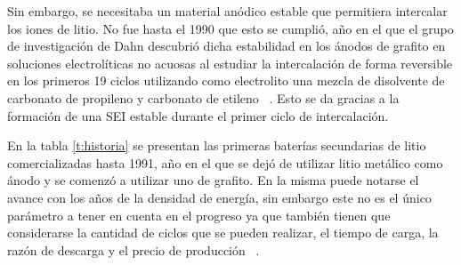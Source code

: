 Sin embargo, se necesitaba un material anódico estable que permitiera intercalar
los iones de litio. No fue hasta el 1990 que esto se cumplió, año en el que el
grupo de investigación de Dahn descubrió dicha estabilidad en los ánodos de 
grafito en soluciones electrolíticas no acuosas al estudiar la intercalación de 
forma reversible en los primeros 19 ciclos utilizando como electrolito una mezcla 
de disolvente de carbonato de propileno y carbonato de etileno ~\cite{fong1990}. 
Esto se da gracias a la formación de una SEI estable durante el primer ciclo de 
intercalación. 

En la tabla \ref{t:historia} se presentan las primeras baterías secundarias de 
litio comercializadas hasta 1991, año en el que se dejó de utilizar litio 
metálico como ánodo y se comenzó a utilizar uno de grafito. En la misma puede 
notarse el avance con los años de la densidad de energía, sin embargo este no es 
el único parámetro a tener en cuenta en el progreso ya que también tienen que 
considerarse la cantidad de ciclos que se pueden realizar, el tiempo de carga, la 
razón de descarga y el precio de producción ~\cite{reddy2020}. 
\begin{table}[h]
    \centering
    \caption{Primeras baterías de litio recargables comercializadas 
    ~\cite{reddy2020}.}
    \setlength\extrarowheight{2pt}
    \label{t:historia}
\end{table}


